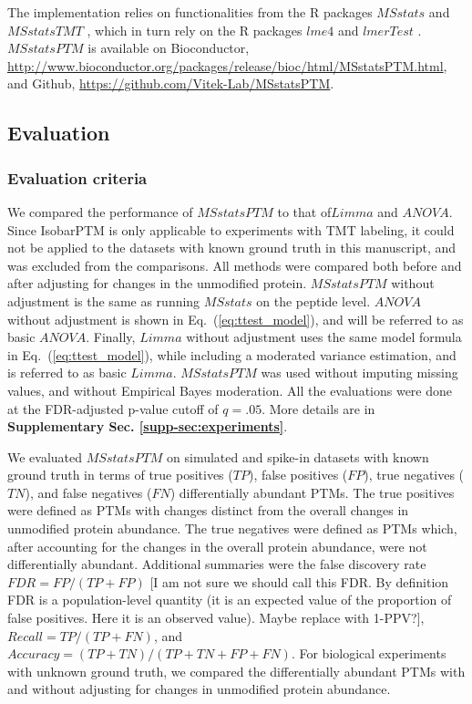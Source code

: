 \documentclass[mcp]{article}
\numberwithin{table}{section}
\def\todo#1{{\color{red}[#1]}}
\def\eqref#1{Eq.~(\ref{eq:#1})}
\begin{document}
The implementation relies on functionalities from the R packages $MSstats$ \cite{Choi:2014} and $MSstatsTMT$ \cite{Huang:2020}, which in turn rely on the R packages $lme4$ \cite{Bates2015} and $lmerTest$ \cite{Kuznetsova2017}. $MSstatsPTM$ is available on Bioconductor, \url{http://www.bioconductor.org/packages/release/bioc/html/MSstatsPTM.html}, and Github, \url{https://github.com/Vitek-Lab/MSstatsPTM}.

\subsection*{Evaluation}

\subsubsection*{Evaluation criteria}

We compared the performance of $MSstatsPTM$ to that of$Limma$ and $ANOVA$. Since IsobarPTM is only applicable to experiments with TMT labeling, it could not be applied to the datasets with known ground truth in this manuscript, and was excluded from the comparisons. All methods were compared both before and after adjusting for changes in the unmodified protein. $MSstatsPTM$ without adjustment is the same as running $MSstats$ on the peptide level. $ANOVA$ without adjustment is shown in \eqref{ttest_model}, and will be referred to as basic $ANOVA$. Finally, $Limma$ without adjustment uses the same model formula in \eqref{ttest_model}, while including a moderated variance estimation, and is referred to as basic $Limma$. $MSstatsPTM$ was used without imputing missing values, and without Empirical Bayes moderation. All the evaluations were done at the FDR-adjusted p-value cutoff of $q=.05$. More details are in {\bf Supplementary Sec. \ref{supp-sec:experiments}}. 

We evaluated $MSstatsPTM$ on simulated and spike-in datasets with known ground truth in terms of true positives ($TP$), false positives ($FP$), true negatives ($TN$), and false negatives ($FN$) differentially abundant PTMs. The true positives were defined as PTMs with changes distinct from the overall changes in unmodified protein abundance. The true negatives were defined as PTMs which, after accounting for the changes in the overall protein abundance, were not differentially abundant. Additional summaries were the false discovery rate $FDR=FP/(TP+FP)$ \todo{I am not sure we should call this FDR. By definition FDR is a population-level quantity (it is an expected value of the proportion of false positives. Here it is an observed value). Maybe replace with 1-PPV?}, $Recall=TP/(TP + FN)$, and $Accuracy=(TP + TN) / (TP + TN + FP + FN)$.
For biological experiments with unknown ground truth, we compared the differentially abundant PTMs with and without adjusting for changes in unmodified protein abundance. 
\end{document}
